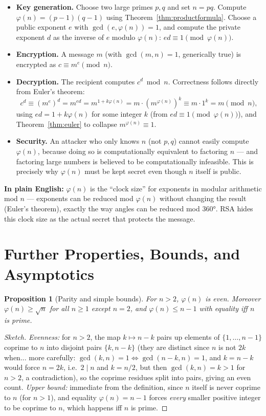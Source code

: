 \documentclass[11pt]{article}
\newtheorem{proposition}[theorem]{Proposition}
\theoremstyle{definition}
\theoremstyle{remark}
\begin{document}
\begin{itemize}[leftmargin=1.4em]
\item \textbf{Key generation.} Choose two large primes $p, q$ and set $n = pq$. Compute $\varphi(n) = (p-1)(q-1)$ using Theorem~\ref{thm:productformula}. Choose a public exponent $e$ with $\gcd(e,\varphi(n))=1$, and compute the private exponent $d$ as the inverse of $e$ modulo $\varphi(n)$: $ed \equiv 1 \pmod{\varphi(n)}$.
\item \textbf{Encryption.} A message $m$ (with $\gcd(m,n)=1$, generically true) is encrypted as $c \equiv m^e \pmod n$.
\item \textbf{Decryption.} The recipient computes $c^d \bmod n$. Correctness follows directly from Euler's theorem:
\[
c^d \equiv (m^e)^d = m^{ed} = m^{1 + k\varphi(n)} = m\cdot (m^{\varphi(n)})^k \equiv m \cdot 1^k = m \pmod n,
\]
using $ed = 1 + k\varphi(n)$ for some integer $k$ (from $ed \equiv 1 \pmod{\varphi(n)}$), and Theorem~\ref{thm:euler} to collapse $m^{\varphi(n)} \equiv 1$.
\item \textbf{Security.} An attacker who only knows $n$ (not $p,q$) cannot easily compute $\varphi(n)$, because doing so is computationally equivalent to factoring $n$ — and factoring large numbers is believed to be computationally infeasible. This is precisely why $\varphi(n)$ must be kept secret even though $n$ itself is public.
\end{itemize}

\noindent\textbf{In plain English:} $\varphi(n)$ is the ``clock size'' for exponents in modular arithmetic mod $n$ — exponents can be reduced mod $\varphi(n)$ without changing the result (Euler's theorem), exactly the way angles can be reduced mod $360°$. RSA hides this clock size as the actual secret that protects the message.

\section{Further Properties, Bounds, and Asymptotics}

\begin{proposition}[Parity and simple bounds]
For $n > 2$, $\varphi(n)$ is even. Moreover $\varphi(n) \ge \sqrt{n}$ for all $n\ge1$ except $n=2$, and $\varphi(n) \le n-1$ with equality iff $n$ is prime.
\end{proposition}

\begin{proof}[Sketch]
\emph{Evenness:} for $n>2$, the map $k \mapsto n-k$ pairs up elements of $\{1,\dots,n-1\}$ coprime to $n$ into disjoint pairs $\{k, n-k\}$ (they are distinct since $n$ is not $2k$ when... more carefully: $\gcd(k,n)=1 \iff \gcd(n-k,n)=1$, and $k = n-k$ would force $n=2k$, i.e.\ $2\mid n$ and $k=n/2$, but then $\gcd(k,n)=k>1$ for $n>2$, a contradiction), so the coprime residues split into pairs, giving an even count. \emph{Upper bound:} immediate from the definition, since $n$ itself is never coprime to $n$ (for $n>1$), and equality $\varphi(n)=n-1$ forces \emph{every} smaller positive integer to be coprime to $n$, which happens iff $n$ is prime.
\end{proof}
\end{document}
